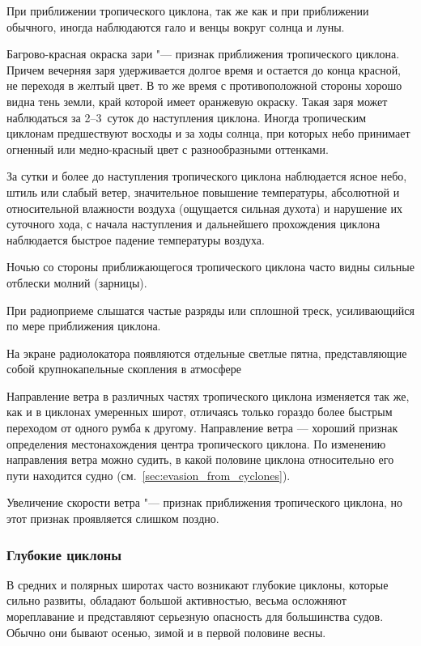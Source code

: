  При приближении тропического циклона, так же как и при
приближении обычного, иногда наблюдаются гало и венцы вокруг солнца и
луны.

 Багрово-красная окраска зари "--- признак приближения тропического
циклона. Причем вечерняя заря удерживается долгое время и остается до
конца красной, не переходя в желтый цвет. В то же время с
противоположной стороны хорошо видна тень земли, край которой имеет
оранжевую окраску. Такая заря может наблюдаться за 2--3~суток до
наступления циклона. Иногда тропическим циклонам предшествуют восходы
и за ходы солнца, при которых небо принимает огненный или
медно-красный цвет с разнообразными оттенками.

 За сутки и более до наступления тропического циклона
наблюдается ясное небо, штиль или слабый ветер, значительное повышение
температуры, абсолютной и относительной влажности воздуха (ощущается
сильная духота) и нарушение их суточного хода, с начала наступления и
дальнейшего прохождения циклона наблюдается быстрое падение
температуры воздуха.

 Ночью со стороны приближающегося тропического циклона часто видны
сильные отблески молний (зарницы).

 При радиоприеме слышатся частые разряды или сплошной треск,
усиливающийся по мере приближения циклона.

 На экране радиолокатора появляются отдельные светлые пятна,
представляющие собой крупнокапельные скопления в атмосфере

 Направление ветра в различных частях тропического циклона
изменяется так же, как и в циклонах умеренных широт, отличаясь только
гораздо более быстрым переходом от одного румба к другому. Направление
ветра — хороший признак определения местонахождения центра
тропического циклона. По изменению направления ветра можно судить, в
какой половине циклона относительно его пути находится судно
(см.~\ref{sec:evasion_from_cyclones}).

 Увеличение скорости ветра "--- признак приближения тропического
циклона, но этот признак проявляется слишком поздно.

\subsubsection{Глубокие циклоны}

В средних и полярных широтах часто возникают глубокие циклоны, которые
сильно развиты, обладают большой активностью, весьма осложняют
мореплавание и представляют серьезную опасность для большинства
судов. Обычно они бывают осенью, зимой и в первой половине весны.

